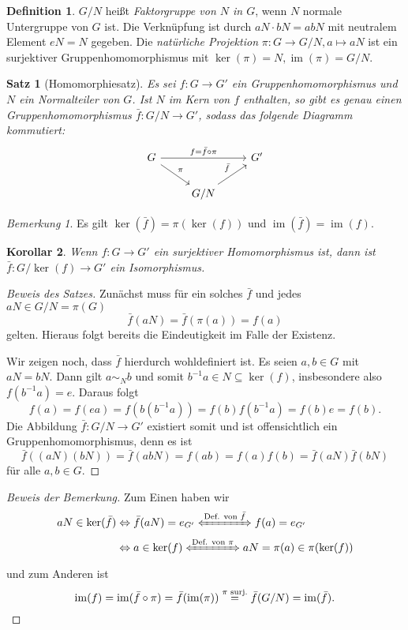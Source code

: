 \documentclass[12pt]{scrartcl} %
\DeclareMathOperator{\im}{im}
\newtheorem{thm}{Satz}[section]
\newtheorem{kor}[thm]{Korollar}
\theoremstyle{definition}
\newtheorem*{defn}{Definition}
\theoremstyle{remark}
\newtheorem*{nb}{Bemerkung}
\begin{document}
\begin{defn}
	$G/N$ heißt \emph{Faktorgruppe von $N$ in $G$}, wenn $N$ normale Untergruppe von $G$ ist.
	Die Verknüpfung ist durch $aN \cdot bN = abN$ mit neutralem Element $eN = N$ gegeben.
	Die \emph{natürliche Projektion} $\pi : G \rightarrow G/N, a \mapsto aN$ ist ein surjektiver Gruppenhomomorphismus mit $\ker(\pi) = N, \im(\pi) = G/N$.
\end{defn}

\begin{thm}[Homomorphiesatz]
	Es sei $f: G \rightarrow G'$ ein Gruppenhomomorphismus und \(N\) ein Normalteiler von \(G\).
	Ist \(N\) im Kern von \(f\) enthalten, so gibt es genau einen Gruppenhomomorphismus $\bar{f}: G/N \rightarrow G'$, sodass das folgende Diagramm kommutiert:
	\[\begin{tikzcd}
		G \arrow[rd,"\pi"] \arrow[rr,"f=\bar f\circ \pi"] & & G'\\
		& G/N \arrow[ru,"\bar f"] &
	\end{tikzcd}\]
\end{thm}

\begin{nb}
	Es gilt $\ker(\bar{f}) = \pi(\ker(f))$ und $\im(\bar{f}) = \im(f)$. 
\end{nb}

\begin{kor}
	Wenn $f: G \rightarrow G'$ ein surjektiver Homomorphismus ist, dann ist $\bar{f}: G/\ker(f) \rightarrow G'$ ein Isomorphismus.
\end{kor}

\begin{proof}[Beweis des Satzes]
	Zunächst muss für ein solches \(\bar f\) und jedes \(aN \in G/N = \pi(G)\)
	\[\bar f(aN) = \bar f(\pi(a)) = f(a)\]
	gelten.
	Hieraus folgt bereits die Eindeutigkeit im Falle der Existenz.

	Wir zeigen noch, dass $\bar{f}$ hierdurch wohldefiniert ist.
	Es seien $a, b \in G$ mit $aN = bN$.
	Dann gilt $a \sim_{N} b$ und somit $b^{-1}a \in N \subseteq \ker(f)$, insbesondere also \(f(b^{-1}a) = e\).
	Daraus folgt $$f(a) = f(ea) = f(b(b^{-1}a)) = f(b) f(b^{-1}a) = f(b)e = f(b).$$
	Die Abbildung $\bar{f}: G/N \rightarrow G'$ existiert somit und ist offensichtlich ein Gruppenhomomorphismus, denn es ist
	$$\bar{f}((aN)(bN)) = \bar{f}(abN) = f(ab) = f(a)f(b) = \bar{f}(aN)\bar{f}(bN)$$ für alle $a, b \in G$.
\end{proof}

\begin{proof}[Beweis der Bemerkung]
	Zum Einen haben wir
	\begin{align*}
		aN \in \ker(\bar{f}) &\Leftrightarrow \bar f(aN) = e_{G'} \xLeftrightarrow{\text{Def. von \(\bar{f}\)}} f(a) = e_{G'}\\
		&\Leftrightarrow a \in \ker(f) \xLeftrightarrow{\text{Def. von \(\pi\)}} aN = \pi(a) \in \pi(\ker(f))
	\end{align*}
	und zum Anderen ist
	\[\im(f) = \im(\bar{f} \circ \pi) = \bar{f}(\im(\pi)) \stackrel{\text{\(\pi\) surj.}}{=} \bar{f}(G/N) = \im(\bar{f}).\qedhere\]
\end{proof}
\end{document}
